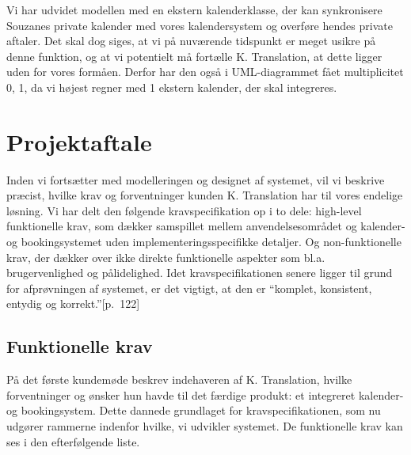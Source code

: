 \documentclass[12pt]{article}   %
\begin{document}
  
Vi har udvidet modellen med en ekstern kalenderklasse, der kan synkronisere 
Souzanes private kalender med vores kalendersystem og overføre hendes private
aftaler. Det skal dog siges, at vi på nuværende tidspunkt er meget usikre på
denne funktion, og at vi potentielt må fortælle K. Translation, at dette ligger
uden for vores formåen. Derfor har den også i UML-diagrammet fået multiplicitet 
0, 1, da vi højest regner med 1 ekstern kalender, der skal integreres.\\



\section{Projektaftale}
Inden vi fortsætter med modelleringen og designet af systemet, vil vi beskrive
præcist, hvilke krav og forventninger kunden K. Translation har til vores
endelige løsning. Vi har delt den følgende kravspecifikation op i to dele:
high-level funktionelle krav, som dækker samspillet mellem anvendelsesområdet og
kalender- og bookingsystemet uden implementeringsspecifikke detaljer. Og
non-funktionelle krav, der dækker over ikke direkte funktionelle aspekter som
bl.a. brugervenlighed og pålidelighed. Idet kravspecifikationen senere ligger
til grund for afprøvningen af systemet, er det vigtigt, at den er ``komplet,
konsistent, entydig og korrekt.''\cite{oose}[p.~122] \\

\subsection{Funktionelle krav}
På det første kundemøde beskrev indehaveren af K. Translation, hvilke
forventninger og ønsker hun havde til det færdige produkt: et integreret
kalender- og bookingsystem. Dette dannede grundlaget for kravspecifikationen, som
nu udgører rammerne indenfor hvilke, vi udvikler systemet. De funktionelle
krav kan ses i den efterfølgende liste.\\
\end{document}
